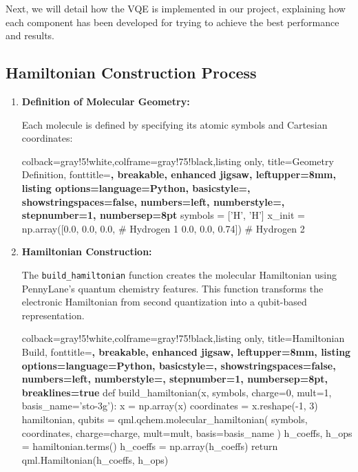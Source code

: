 \bigskip

Next, we will detail how the VQE is implemented in our project, explaining how each component has been developed for trying to achieve the best performance and results.
\subsection{Hamiltonian Construction Process}

\begin{enumerate}
    \item \textbf{Definition of Molecular Geometry:}

    Each molecule is defined by specifying its atomic symbols and Cartesian coordinates:
    
    \begin{tcblisting}{colback=gray!5!white,colframe=gray!75!black,listing only,
      title=Geometry Definition, fonttitle=\bfseries, breakable, enhanced jigsaw, leftupper=8mm,
      listing options={language=Python, basicstyle=\ttfamily\small,
      showstringspaces=false, numbers=left, numberstyle=\footnotesize, stepnumber=1, numbersep=8pt}}
symbols = ['H', 'H']
x_init = np.array([0.0, 0.0, 0.0,  # Hydrogen 1
                   0.0, 0.0, 0.74])  # Hydrogen 2
    \end{tcblisting}

    \item \textbf{Hamiltonian Construction:}

    The \texttt{build\_hamiltonian} function creates the molecular Hamiltonian using PennyLane’s quantum chemistry features. This function transforms the electronic Hamiltonian from second quantization into a qubit-based representation.

    \begin{tcblisting}{colback=gray!5!white,colframe=gray!75!black,listing only,
      title=Hamiltonian Build, fonttitle=\bfseries, breakable, enhanced jigsaw, leftupper=8mm,
      listing options={language=Python, basicstyle=\ttfamily\small,
      showstringspaces=false, numbers=left, numberstyle=\footnotesize, stepnumber=1, numbersep=8pt, breaklines=true}}
def build_hamiltonian(x, symbols, charge=0, mult=1, basis_name='sto-3g'):
    x = np.array(x)
    coordinates = x.reshape(-1, 3)
    hamiltonian, qubits = qml.qchem.molecular_hamiltonian(
        symbols, coordinates, charge=charge, mult=mult, basis=basis_name
    )
    h_coeffs, h_ops = hamiltonian.terms()
    h_coeffs = np.array(h_coeffs)
    return qml.Hamiltonian(h_coeffs, h_ops)
    \end{tcblisting}


\end{enumerate}
